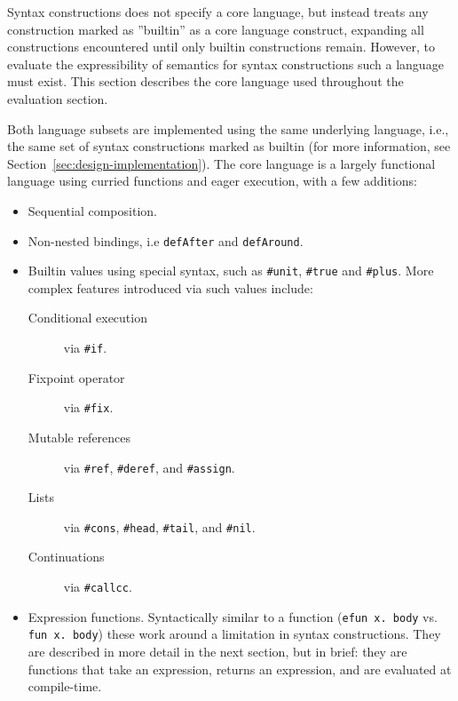 \documentclass{kththesis}
\begin{document}
Syntax constructions does not specify a core language, but instead treats any construction marked as ''builtin'' as a core language construct, expanding all constructions encountered until only builtin constructions remain. However, to evaluate the expressibility of semantics for syntax constructions such a language must exist. This section describes the core language used throughout the evaluation section.

Both language subsets are implemented using the same underlying language, i.e., the same set of syntax constructions marked as builtin (for more information, see Section~\ref{sec:design-implementation}). The core language is a largely functional language using curried functions and eager execution, with a few additions:
\begin{itemize}
  \item Sequential composition.
  \item Non-nested bindings, i.e \texttt{defAfter} and \texttt{defAround}. %
  \item Builtin values using special syntax, such as \texttt{#unit}, \texttt{#true} and \texttt{#plus}. More complex features introduced via such values include:
  \begin{description}
    \item[Conditional execution] via \texttt{#if}.
    \item[Fixpoint operator] via \texttt{#fix}.
    \item[Mutable references] via \texttt{#ref}, \texttt{#deref}, and \texttt{#assign}.
    \item[Lists] via \texttt{#cons}, \texttt{#head}, \texttt{#tail}, and \texttt{#nil}.
    \item[Continuations] via \texttt{#callcc}.
  \end{description}
  \item Expression functions. Syntactically similar to a function (\texttt{efun x. body} vs. \texttt{fun x. body}) these work around a limitation in syntax constructions. They are described in more detail in the next section, but in brief: they are functions that take an expression, returns an expression, and are evaluated at compile-time.
\end{itemize}
\end{document}
